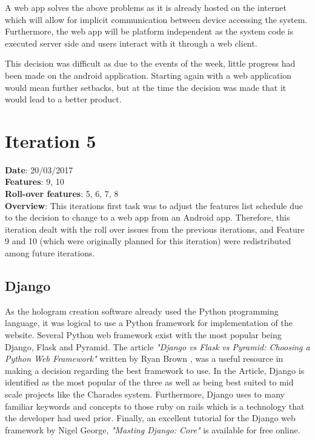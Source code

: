 A web app solves the above problems as it is already hosted on the internet which will allow for implicit communication between device accessing the system. Furthermore, the web app will be platform independent as the system code is executed server side and users interact with it through a web client.

This decision was difficult as due to the events of the week, little progress had been made on the android application. Starting again with a web application would mean further setbacks, but at the time the decision was made that it would lead to a better product.

\newpage

\section{Iteration 5}
\textbf{Date}: 20/03/2017 \\
\textbf{Features}: 9, 10 \\
\textbf{Roll-over features}: 5, 6, 7, 8 \\
\textbf{Overview}: This iterations first task was to adjust the features list schedule due to the decision to change to a web app from an Android app. Therefore, this iteration dealt with the roll over issues from the previous iterations, and Feature 9 and 10 (which were originally planned for this iteration) were redistributed among future iterations.

\subsection{Django}
As the hologram creation software already used the Python programming language, it was logical to use a Python framework for implementation of the website. Several Python web framework exist with the most popular being Django, Flask and Pyramid. The article \textit{"Django vs Flask vs Pyramid: Choosing a Python Web Framework"} written by Ryan Brown \cite{python_webframework_comparison}, was a useful resource in making a decision regarding the best framework to use. In the Article, Django is identified as the most popular of the three as well as being best suited to mid scale projects like the Charades system. Furthermore, Django uses to many familiar keywords and concepts to those ruby on rails which is a technology that the developer had used prior. Finally, an excellent tutorial for the Django web framework by Nigel George, \textit{"Masting Django: Core"} \cite{django_book} is available for free online. 

